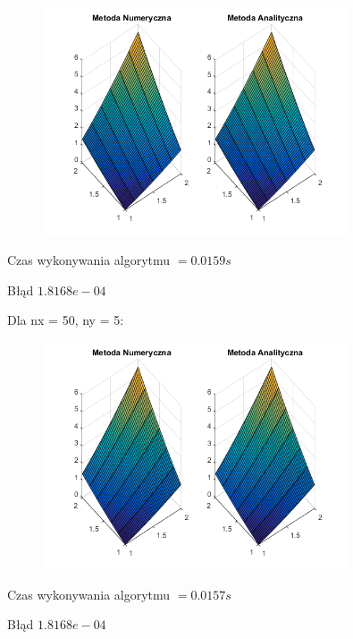 \begin{figure}[!ht]
	\begin{center}
		\includegraphics[width=0.8\textwidth]{Lab5/charts/zad3/5x50.png}
	\end{center}
\end{figure}

Czas wykonywania algorytmu $ = 0.0159 s$

Błąd $1.8168e-04$

Dla nx = 50, ny = 5:

\begin{figure}[!ht]
	\begin{center}
		\includegraphics[width=0.8\textwidth]{Lab5/charts/zad3/50x5.png}
	\end{center}
\end{figure}

Czas wykonywania algorytmu $ = 0.0157 s$

Błąd $1.8168e-04$


\newpage